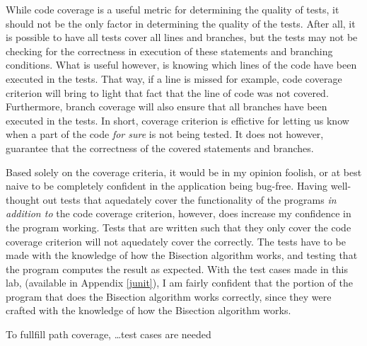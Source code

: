 While code coverage is a useful metric for determining the quality of tests, it
should not be the only factor in determining the quality of the tests. After
all, it is possible to have all tests cover all lines and branches, but the
tests may not be checking for the correctness in execution of these statements
and branching conditions.  What is useful however, is knowing which lines of
the code have been executed in the tests. That way, if a line is missed for
example, code coverage criterion will bring to light that fact that the line of
code was not covered. Furthermore, branch coverage will also ensure that all
branches have been executed in the tests. In short, coverage criterion is
effictive for letting us know when a part of the code \textit{for sure} is not
being tested. It does not however, guarantee that the correctness of the
covered statements and branches.

Based solely on the coverage criteria, it would be in my opinion foolish,
or at best naive to be completely confident in the application being bug-free.
Having well-thought out tests that aquedately cover the functionality of the
programs \textit{in addition to} the code coverage criterion, however, does
increase my confidence in the program working. Tests that are written such that 
they only cover the code coverage criterion will not aquedately cover the 
correctly. The tests have to be made with the knowledge of how the Bisection
algorithm works, and testing that the program computes the result as expected.
With the test cases made in this lab, (available in Appendix \ref{junit}),
I am fairly confident that the portion of the program that does the Bisection
algorithm works correctly, since they were crafted with the knowledge
of how the Bisection algorithm works. 

To fullfill path coverage, \dots test cases are needed 


